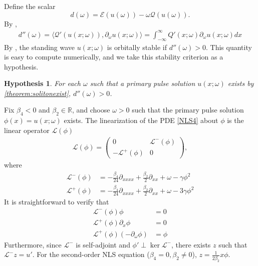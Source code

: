 \documentclass[12pt]{article}
\def\R{{\mathbb R}}
\def\calE{{\mathcal E}}
\def\calQ{{\mathcal Q}}
\def\calL{{\mathcal L}}
\newtheorem{hypothesis}{Hypothesis}
\begin{document}
Define the scalar
\begin{equation}
d(\omega) = \calE(u(\omega)) - \omega\calQ(u(\omega)).
\end{equation}
By \cite[(2.21)]{Grillakis1987},
\begin{align}\label{ddoubleprime}
d''(\omega) = \langle \calQ'(u(x; \omega)), \partial_\omega u(x; \omega) \rangle
= \int_{-\infty}^\infty Q'(x; \omega) \partial_\omega u(x; \omega) dx
\end{align}
By \cite[Theorem 3.5]{Grillakis1987}, the standing wave $u(x; \omega)$ is orbitally stable if $d''(\omega) > 0$. This quantity is easy to compute numerically, and we take this stability criterion as a hypothesis.

\begin{hypothesis}\label{hyp:dccpos}
For each $\omega$ such that a primary pulse solution $u(x; \omega)$ exists by \cref{theorem:solitonexist}, $d''(\omega) > 0$.
\end{hypothesis}

Fix $\beta_4 < 0$ and $\beta_2 \in \R$, and choose $\omega > 0$ such that the primary pulse solution $\phi(x) = u(x; \omega)$ exists. The linearization of the PDE \cref{NLS4} about $\phi$ is the linear operator $\calL(\phi)$
\begin{align}\label{defLphi}
\calL(\phi) = 
\begin{pmatrix}
0 & \calL^-(\phi) \\
-\calL^+(\phi) & 0
\end{pmatrix},
\end{align}
where
\begin{align*}
\calL^-(\phi) &= -\frac{\beta_4}{24} \partial_{xxxx} + \frac{\beta_2}{2} \partial_{xx} + \omega - \gamma \phi^2 \\
\calL^+(\phi) &= -\frac{\beta_4}{24} \partial_{xxxx} + \frac{\beta_2}{2} \partial_{xx} + \omega - 3 \gamma \phi^2
\end{align*}
It is straightforward to verify that 
\begin{align*}
\calL^-(\phi) \phi &= 0 \\
\calL^+(\phi) \partial_x \phi &= 0 \\
\calL^+(\phi)(-\partial_\omega \phi) &= \phi
\end{align*}
Furthermore, since $\calL^-$ is self-adjoint and $\phi' \perp \ker \calL^-$, there exists $z$ such that $\calL^- z = u'$. For the second-order NLS equation ($\beta_4 = 0, \beta_2 \neq 0$), $z = \frac{1}{2 \beta_2} x \phi$. 
\end{document}
